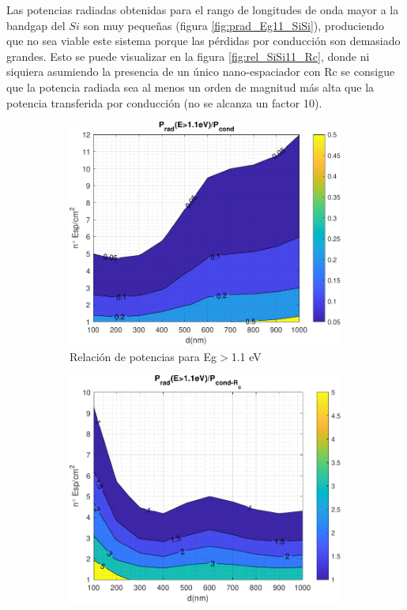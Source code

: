 Las potencias radiadas obtenidas para el rango de longitudes de onda mayor a la bandgap del $Si$ son muy pequeñas (figura \ref{fig:prad_Eg11_SiSi}), produciendo que no sea viable este sistema porque las pérdidas por conducción son demasiado grandes. Esto se puede visualizar en la figura \ref{fig:rel_SiSi11_Rc}, donde ni siquiera asumiendo la presencia de un único nano-espaciador con Rc se consigue que la potencia radiada sea al menos un orden de magnitud más alta que la potencia transferida por conducción (no se alcanza un factor 10).
\begin{figure}[H]
	\centering
\begin{subfigure}[b]{0.49\textwidth}
	\centering
		\includegraphics[width=1.00\textwidth]{figuras/Resultados/RelacionCondRad/rel_SiSi11.pdf}
	\caption{Relación de potencias para Eg$>$1.1 eV}
	\label{fig:rel_SiSi11}
\end{subfigure}
\hfill
\begin{subfigure}[b]{0.49\textwidth}
	\centering
		\includegraphics[width=1.00\textwidth]{figuras/Resultados/RelacionCondRad/rel_SiSi11_Rc.pdf}

\end{subfigure}
\end{figure}
